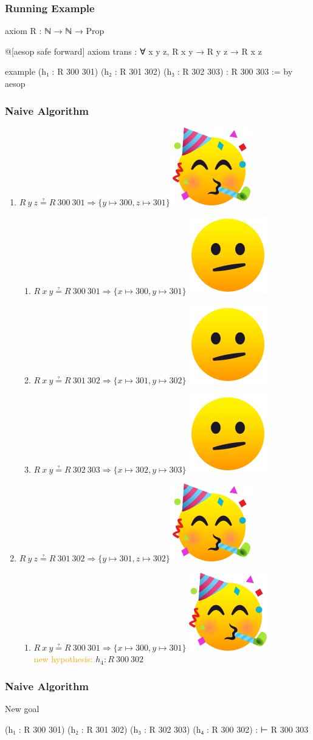 \documentclass[xetex]{beamer}
\newlength{\emojiheight}
\newcommand{\good}{\includegraphics[height=\emojiheight]{images/1f973}}
\newcommand{\bad}{\includegraphics[height=\emojiheight]{images/1fae4}}
\newcommand{\orange}[1]{\textcolor{orange}{#1}}
\begin{document}
\begin{frame}[fragile]
  \frametitle{Running Example}

  \begin{leancode}
    axiom R : ℕ → ℕ → Prop

    @[aesop safe forward]
    axiom trans : ∀ x y z, R x y → R y z → R x z

    example
        (h₁ : R 300 301)
        (h₂ : R 301 302)
        (h₃ : R 302 303) :
        R 300 303 := by
      aesop
  \end{leancode}
\end{frame}

\begin{frame}
  \frametitle{Naive Algorithm}

  \begin{enumerate}[<+->]
    \item $R~y~z ≟ R~300~301 ⇒ \{y ↦ 300, z ↦ 301\}$ \good
          \begin{enumerate}[<+->]
            \item $R~x~y ≟ R~300~301 ⇒ \{x ↦ 300, y ↦ 301\}$ \bad
            \item $R~x~y ≟ R~301~302 ⇒ \{x ↦ 301, y ↦ 302\}$ \bad
            \item $R~x~y ≟ R~302~303 ⇒ \{x ↦ 302, y ↦ 303\}$ \bad
          \end{enumerate}
    \item $R~y~z ≟ R~301~302 ⇒ \{y ↦ 301, z ↦ 302\}$ \good
          \begin{enumerate}[<+->]
            \item $R~x~y ≟ R~300~301 ⇒ \{x ↦ 300, y ↦ 301\}$ \good \\
                  \orange{new hypothesis:} $h_{4} : R~300~302$
          \end{enumerate}
  \end{enumerate}
\end{frame}

\begin{frame}[fragile]
  \frametitle{Naive Algorithm}

  \begin{block}{New goal}
    \begin{leancode}
        (h₁ : R 300 301)
        (h₂ : R 301 302)
        (h₃ : R 302 303)
        (h₄ : R 300 302) :
        ⊢ R 300 303
    \end{leancode}
  \end{block}
\end{frame}
\end{document}
